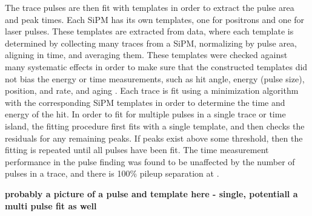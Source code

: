 The trace pulses are then fit with templates in order to extract the pulse area and peak times. Each SiPM has its own templates, one for positrons and one for laser pulses. These templates are extracted from data, where each template is determined by collecting many traces from a SiPM, normalizing by pulse area, aligning in time, and averaging them. These templates were checked against many systematic effects in order to make sure that the constructed templates did not bias the energy or time measurements, such as hit angle, energy (pulse size), position, and rate, and aging \cite{Kaspar:2016ofv,AFThesis}. Each trace is fit using a \chisq minimization algorithm with the corresponding SiPM templates in order to determine the time and energy of the hit. In order to fit for multiple pulses in a single trace or time island, the fitting procedure first fits with a single template, and then checks the residuals for any remaining peaks. If peaks exist above some threshold, then the fitting is repeated until all pulses have been fit. The time measurement performance in the pulse finding was found to be unaffected by the number of pulses in a trace, and there is 100\% pileup separation at  \cite{AFThesis}. 


\textbf{probably a picture of a pulse and template here - single, potentiall a multi pulse fit as well}


